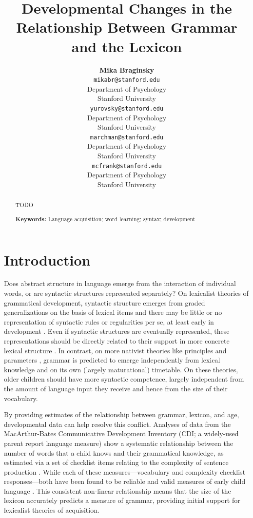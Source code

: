 \documentclass[10pt,letterpaper]{article}
\title{Developmental Changes in the Relationship Between Grammar and the Lexicon}
\author{{\large \bf Mika Braginsky} \\
  \texttt{mikabr@stanford.edu} \\
  Department of Psychology \\
  Stanford University
  \And {\large \bf Daniel Yurovsky} \\
  \texttt{yurovsky@stanford.edu} \\
  Department of Psychology \\
  Stanford University
    \And {\large \bf Virginia Marchman} \\
    \texttt{marchman@stanford.edu} \\
  Department of Psychology \\
  Stanford University
    \And {\large \bf Michael C. Frank}\\
    \texttt{mcfrank@stanford.edu} \\
  Department of Psychology \\
  Stanford University}
\begin{document}
\maketitle

\begin{abstract}
TODO

\textbf{Keywords:} 
Language acquisition; word learning; syntax; development
\end{abstract}

\section{Introduction}

Does abstract structure in language emerge from the interaction of individual words, or are syntactic structures represented separately? On lexicalist theories of grammatical development, syntactic structure emerges from graded generalizations on the basis of lexical items and there may be little or no representation of syntactic rules or regularities per se, at least early in development \cite{tomasello2001,tomasello2003}. Even if syntactic structures are eventually represented, these representations should be directly related to their support in more concrete lexical structure \cite{bannard2009,bod2010}. In contrast, on more nativist theories like principles and parameters \cite{chomsky1981, baker2005}, grammar is predicted to emerge independently from lexical knowledge and on its own (largely maturational) timetable. On these theories, older children should have more syntactic competence, largely independent from the amount of language input they receive and hence from the size of their vocabulary.

By providing estimates of the relationship between grammar, lexicon, and age,  developmental data can help resolve this conflict. Analyses of data from the MacArthur-Bates Communicative Development Inventory (CDI; a widely-used parent report language measure) show a systematic relationship between the number of words that a child knows and their grammatical knowledge, as estimated via a set of checklist items relating to the complexity of sentence production \cite{bates1997,caselli1999}. While each of these measures---vocabulary and complexity checklist responses---both have been found to be reliable and valid measures of early child language \cite{fenson1994,fenson2007}.  This consistent non-linear relationship means that the size of the lexicon accurately predicts a measure of grammar, providing initial support for lexicalist theories of acquisition.
\end{document}
